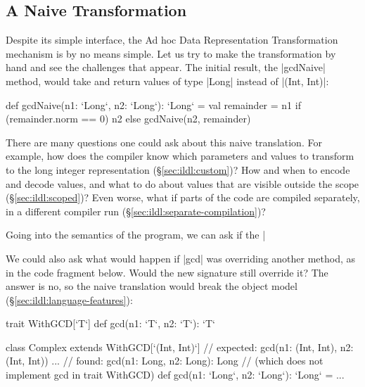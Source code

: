 
\subsection{A Naive Transformation}


Despite its simple interface, the Ad hoc Data Representation Transformation mechanism is by no means simple. Let us try to make the transformation by hand and see the challenges that appear. The initial result, the |gcdNaive| method, would take and return values of type |Long| instead of |(Int, Int)|:

\begin{lstlisting-nobreak}
def gcdNaive(n1: `Long`, n2: `Long`): `Long` = {
  val remainder = n1 %
  if (remainder.norm == 0) n2 else gcdNaive(n2, remainder)
}
\end{lstlisting-nobreak}

There are many questions one could ask about this naive translation. For example, how does the compiler know which parameters and values to transform to the long integer representation (\S\ref{sec:ildl:custom})? How and when to encode and decode values, and what to do about values that are visible outside the scope (\S\ref{sec:ildl:scoped})? Even worse, what if parts of the code are compiled separately, in a different compiler run (\S\ref{sec:ildl:separate-compilation})?

Going into the semantics of the program, we can ask if the |%

We could also ask what would happen if |gcd| was overriding another method, as in the code fragment below. Would the new signature still override it? The answer is no, so the naive translation would break the object model (\S\ref{sec:ildl:language-features}):

\begin{lstlisting-nobreak}
trait WithGCD[`T`] {
  def gcd(n1: `T`, n2: `T`): `T`
}

class Complex extends WithGCD[`(Int, Int)`] {
  // expected: gcd(n1: (Int, Int), n2: (Int, Int)) ...
  // found:    gcd(n1: Long, n2: Long): Long
  // (which does not implement gcd in trait WithGCD)
  def gcd(n1: `Long`, n2: `Long`): `Long` = ...
}
\end{lstlisting-nobreak}


